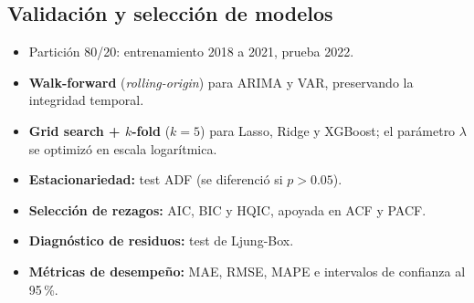 \subsection*{Validación y selección de modelos}

\begin{itemize}
  \item Partición 80/20: entrenamiento 2018 a 2021, prueba 2022.
  \item \textbf{Walk-forward} (\textit{rolling-origin}) para ARIMA y VAR, preservando la integridad temporal.
  \item \textbf{Grid search + $k$-fold} ($k=5$) para Lasso, Ridge y XGBoost; el parámetro $\lambda$ se optimizó en escala logarítmica.
  \item \textbf{Estacionariedad:} test ADF (se diferenció si $p>0.05$).
  \item \textbf{Selección de rezagos:} AIC, BIC y HQIC, apoyada en ACF y PACF.
  \item \textbf{Diagnóstico de residuos:} test de Ljung-Box.
  \item \textbf{Métricas de desempeño:} MAE, RMSE, MAPE e intervalos de confianza al 95\,\%.
\end{itemize}
